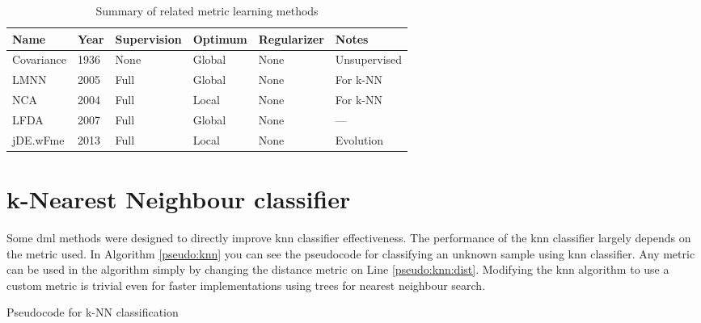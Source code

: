 \documentclass[12pt,a4paper]{report}
\begin{document}
\begin{table}[ht] \centering
\begin{tabular}{llllll}
\hline
Name & Year & Supervision & Optimum & Regularizer & Notes \\
\hline
Covariance & 1936 & None & Global & None & Unsupervised \\
LMNN & 2005 & Full & Global & None & For k-NN \\
NCA & 2004 & Full & Local & None & For k-NN \\
LFDA & 2007 & Full & Global & None & — \\
jDE.wFme & 2013 & Full & Local & None & Evolution \\
\hline
\end{tabular}
\caption{Summary of related metric learning methods} \label{tab:rw:summary}
\end{table}

\section{k-Nearest Neighbour classifier} \label{alg:knn}

Some \acl{dml} methods were designed to directly improve \acl{knn} classifier effectiveness. The performance of the \ac{knn} classifier largely depends on the metric used. In Algorithm \ref{pseudo:knn} you can see the pseudocode for classifying an unknown sample using \ac{knn} classifier. Any metric can be used in the algorithm simply by changing the distance metric on Line \ref{pseudo:knn:dist}. Modifying the \ac{knn} algorithm to use a custom metric is trivial even for faster implementations using trees for nearest neighbour search.

\begin{algorithm}[t]
\caption{Pseudocode for k-NN classification} \label{pseudo:knn}
\DontPrintSemicolon
\LinesNumbered
{}
\end{algorithm} 
\end{document}
